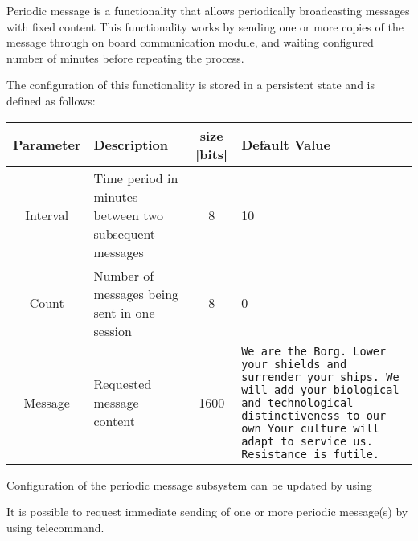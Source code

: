 
Periodic message is a functionality that allows periodically broadcasting messages with fixed content
This functionality works by sending one or more copies of the message through on board communication module,
 and waiting configured number of minutes before repeating the process. 

The configuration of this functionality is stored in a persistent state and is defined as follows:
\begin{center}
\begin{tabular}{c | m{4.5cm} | c | m{9cm}}
    \textbf{Parameter} & \textbf{Description} & \textbf{size [bits]} & \textbf{Default Value} \\
    \hline \hline
    Interval & Time period in minutes between two subsequent messages & 8 & 10 \\
    \hline
    Count & Number of messages being sent in one session & 8 & 0 \\
    \hline
    Message & Requested message content & 1600 & 
    \texttt{We are the Borg. Lower your shields and surrender your ships. We will add your biological and technological distinctiveness to our own Your culture will adapt to service us. Resistance is futile.} \\
    \hline
\end{tabular}
\end{center}

Configuration of the periodic message subsystem can be updated by using 


It is possible to request immediate sending of one or more periodic message(s) by using  telecommand. 


